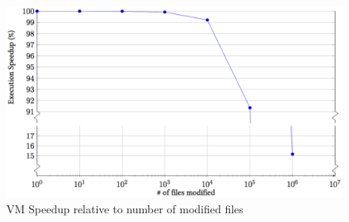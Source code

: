     \begin{figure}[H]
      \centering
      \includegraphics[width=\linewidth]{Images/watchdir-vm.png}
      \caption{VM Speedup relative to number of modified files}
      \label{fig:vm-watch-graph}
    \end{figure}

